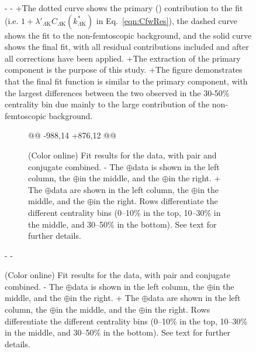 \begin{figure}[h]
{\begin{table}[htbp]
\begin{comment}
- See text for further details.
- }
-  \label{fig:LamKchMwConjFits_3Res}
-\end{figure}
-
-
-\begin{figure}[h!]
-  \centering
-  \texttt{[image: \\ResultsDirBaseLamKs\\SaveNameModLamKs/canKStarCfwFitsLamK0wConj\_0010\_1030\_3050\_LabelLines\\SaveNameModLamKs.pdf]}
-  \caption[\LamALamKs data with fits]
-  {
-  (Color online) Fit results for the \LamKs and \ALamKs data.
-  The \LamKs data is shown in the left column, the \ALamKs in the right, and the rows differentiate the different centrality bins (0--10\% in the top, 10--30\% in the middle, and 30--50\% in the bottom).
- See text for further details.
- }
-  \label{fig:LamK0wConjFits_3Res}
-\end{figure}
-\end{comment}
-%
-
+The dotted curve shows the primary (\LamK) contribution to the fit (i.e. $1 + \lambda'_{\Lambda\mathrm{K}}C_{\Lambda\mathrm{K}}(k^{*}_{\Lambda\mathrm{K}})$ in Eq.\ \ref{eqn:CfwRes}), the dashed curve shows the fit to the non-femtoscopic background, and the solid curve shows the final fit, with all residual contributions included and after all corrections have been applied.
+The extraction of the primary \LamK component is the purpose of this study.
+The figure demonstrates that the final fit function is similar to the primary \LamK component, with the largest differences between the two observed in the 30-50\% centrality bin due mainly to the large contribution of the non-femtoscopic background.
 
 \begin{figure}[h!]
   \centering
@@ -988,14 +876,12 @@
   \caption[\LamK data with fits]
   {
   (Color online) Fit results for the \LamK data, with pair and conjugate combined.
-  The \LamKchP$\oplus$\ALamKchM data is shown in the left column, the \LamKchM$\oplus$\ALamKchP in the middle, and the \LamKs$\oplus$\ALamKs in the right. 
+  The \LamKchP$\oplus$\ALamKchM data are shown in the left column, the \LamKchM$\oplus$\ALamKchP in the middle, and the \LamKs$\oplus$\ALamKs in the right. 
   Rows differentiate the different centrality bins (0--10\% in the top, 10--30\% in the middle, and 30--50\% in the bottom).
   See text for further details.
  }
   \label{fig:LamKFits_3Res}
 \end{figure}
-
-
 

\end{table}}
\end{figure}
